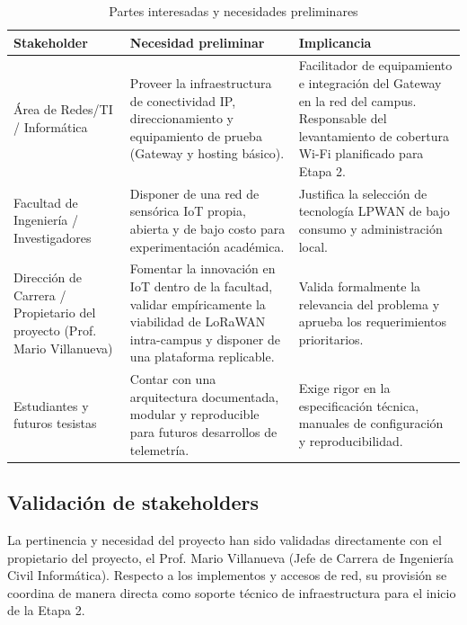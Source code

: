 \documentclass[12pt,oneside,openany,spanish,oldfontcommands]{memoir}
\begin{document}
\begin{table}[H]
\centering
\caption{Partes interesadas y necesidades preliminares}
\label{tab:stakeholders}
\small
\begin{tabularx}{\textwidth}{p{3.4cm} X X}
\toprule
\textbf{Stakeholder} & \textbf{Necesidad preliminar} & \textbf{Implicancia}\\
\midrule
Área de Redes/TI / Informática
&
Proveer la infraestructura de conectividad IP, direccionamiento y equipamiento de prueba (Gateway y hosting básico).
&
Facilitador de equipamiento e integración del Gateway en la red del campus. Responsable del levantamiento de cobertura Wi-Fi planificado para Etapa 2.
\\
\midrule
Facultad de Ingeniería / Investigadores
&
Disponer de una red de sensórica IoT propia, abierta y de bajo costo para experimentación académica.
&
Justifica la selección de tecnología LPWAN de bajo consumo y administración local.
\\
\midrule
Dirección de Carrera / Propietario del proyecto (Prof. Mario Villanueva)
&
Fomentar la innovación en IoT dentro de la facultad, validar empíricamente la viabilidad de LoRaWAN intra-campus y disponer de una plataforma replicable.
&
Valida formalmente la relevancia del problema y aprueba los requerimientos prioritarios.
\\
\midrule
Estudiantes y futuros tesistas
&
Contar con una arquitectura documentada, modular y reproducible para futuros desarrollos de telemetría.
&
Exige rigor en la especificación técnica, manuales de configuración y reproducibilidad.
\\
\bottomrule
\end{tabularx}
\end{table}

\subsection{Validación de stakeholders}

La pertinencia y necesidad del proyecto han sido validadas directamente con el propietario
del proyecto, el Prof. Mario Villanueva (Jefe de Carrera de Ingeniería Civil Informática).
Respecto a los implementos y accesos de red, su provisión se coordina de manera directa
como soporte técnico de infraestructura para el inicio de la Etapa 2.
\end{document}
